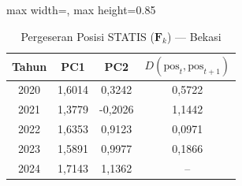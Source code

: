 \begin{table}[H]
\centering
\caption{Pergeseran Posisi STATIS ($\mathbf{F}_k$) --- Bekasi} \label{tab:app1jarak_statis_skor_bekasi}
\begin{adjustbox}{max width=\textwidth, max height=0.85\textheight}
\begin{tabular}{|c|c|c|c|}
\hline
\textbf{Tahun} & \textbf{PC1} & \textbf{PC2} & \textbf{$D(\text{pos}_t, \text{pos}_{t+1})$} \\
\hline
2020 & 1,6014 & 0,3242 & 0,5722 \\
2021 & 1,3779 & -0,2026 & 1,1442 \\
2022 & 1,6353 & 0,9123 & 0,0971 \\
2023 & 1,5891 & 0,9977 & 0,1866 \\
2024 & 1,7143 & 1,1362 & -- \\
\hline
\end{tabular}
\end{adjustbox}
\end{table}